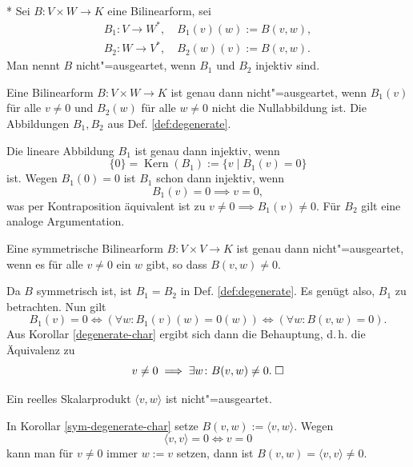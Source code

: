 \begin{Definition}%
\label{def:degenerate}\mbox{}\\*
Sei $B\colon V\times W\to K$ eine Bilinearform, sei
\begin{align*}
B_1\colon V\to W^*,\quad B_1(v)(w):=B(v,w),\\
B_2\colon W\to V^*,\quad B_2(w)(v):=B(v,w).
\end{align*}
Man nennt $B$ nicht"=ausgeartet, wenn $B_1$ und $B_2$ injektiv sind.
\end{Definition}

\begin{Korollar}\label{degenerate-char}
Eine Bilinearform $B\colon V\times W\to K$ ist genau dann
nicht"=ausgeartet, wenn $B_1(v)$ für alle $v\ne 0$ und $B_2(w)$ für
alle $w\ne 0$ nicht die Nullabbildung ist. Die Abbildungen $B_1,B_2$
aus Def. \ref{def:degenerate}.
\end{Korollar}
\begin{Beweis}
Die lineare Abbildung $B_1$ ist genau dann injektiv, wenn
\begin{equation}
\{0\} = \operatorname{Kern}(B_1) := \{v\mid B_1(v)=0\}
\end{equation}
ist. Wegen $B_1(0)=0$ ist $B_1$ schon dann injektiv, wenn
\begin{equation}
B_1(v)=0\implies v=0,
\end{equation}
was per Kontraposition äquivalent ist zu $v\ne 0\implies B_1(v)\ne 0$.
Für $B_2$ gilt eine analoge Argumentation.\;\qedsymbol
\end{Beweis}
\begin{Korollar}\label{sym-degenerate-char}
Eine symmetrische Bilinearform $B\colon V\times V\to K$ ist genau
dann nicht"=ausgeartet, wenn es für alle $v\ne 0$ ein $w$ gibt, so
dass $B(v,w)\ne 0$.
\end{Korollar}
\begin{Beweis}
Da $B$ symmetrisch ist, ist $B_1=B_2$ in Def. \ref{def:degenerate}.
Es genügt also, $B_1$ zu
betrachten. Nun gilt%
\begin{equation}
B_1(v)=0 \iff (\forall w\colon B_1(v)(w)=0(w)) \iff (\forall w\colon B(v,w)=0).
\end{equation}
Aus Korollar \ref{degenerate-char} ergibt sich dann die Behauptung,
d.\,h. die Äquivalenz zu
\begin{equation}
v\ne 0\implies \exists w\colon B(v,w)\ne 0.\;\square
\end{equation}
\end{Beweis}
\begin{Korollar}
Ein reelles Skalarprodukt $\langle v,w\rangle$ ist nicht"=ausgeartet.
\end{Korollar}
\begin{Beweis}
In Korollar \ref{sym-degenerate-char} setze
$B(v,w):=\langle v,w\rangle$. Wegen
\begin{equation}
\langle v,v\rangle = 0 \iff v=0
\end{equation}
kann man für $v\ne 0$ immer $w:=v$ setzen, dann ist
$B(v,w)=\langle v,v\rangle\ne 0$.\;\qedsymbol
\end{Beweis}

